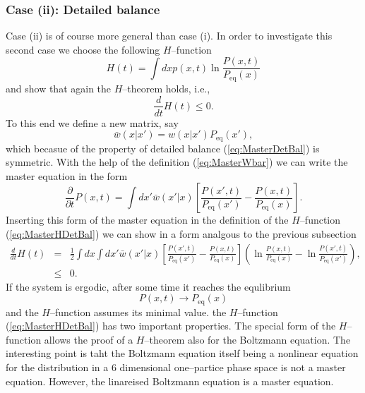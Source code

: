 \subsubsection{Case (ii): Detailed balance}
Case (ii) is of course more general than case (i). In order to
investigate this second case we choose the following $H$--function
\begin{equation}
\label{eq:MasterHDetBal}
  H(t) = \int dx p(x,t) \ln \frac{P(x,t)}{P_{\textrm{eq}}(x)}
\end{equation}
and show that again the $H$--theorem holds, i.e.,
\begin{displaymath}
  \frac{d}{dt} H(t) \le 0.
\end{displaymath}
To this end we define a new matrix, say
\begin{equation}
\label{eq:MasterWbar}
  \bar{w}(x|x') = w(x|x') P_{\textrm{eq}}(x'),
\end{equation}
which becasue of the property of detailed balance (\ref{eq:MasterDetBal}) 
is symmetric.  With the help of the definition (\ref{eq:MasterWbar}) we can
write the master equation in the form 
\begin{displaymath}
  \frac{\partial}{\partial t} P(x,t) = \int dx'  \bar{w}(x'|x)
   \left[ \frac{P(x',t)}{P_{\textrm{eq}}(x')} -
          \frac{P(x,t)}{P_{\textrm{eq}}(x)}         \right].
\end{displaymath}
Inserting this form of the master equation in the definition of the
$H$--function (\ref{eq:MasterHDetBal}) we can show in a form analgous to the
previous subsection
\begin{eqnarray*}
  \frac{d}{dt} H(t) & = & \frac{1}{2} \int dx \int dx' 
                   \bar{w}(x'|x) \left[ \frac{P(x',t)}{P_{\textrm{eq}}(x')} -
          \frac{P(x,t)}{P_{\textrm{eq}}(x)}         \right]
            \left( \ln \frac{P(x,t)}{P_{\textrm{eq}}(x)} 
               - \ln \frac{P(x',t)}{P_{\textrm{eq}}(x')}  \right), \\
    & \le & 0.
\end{eqnarray*}
If the system is ergodic, after some time it reaches the equlibrium
\begin{displaymath}
  P(x,t) \longrightarrow P_{\textrm{eq}}(x) 
\end{displaymath}
and the $H$--function assumes its minimal value. the $H$--function 
(\ref{eq:MasterHDetBal}) has two important properties. 
The special form of
the $H$--function allows the proof of a $H$--theorem also for the Boltzmann
equation. The interesting point is taht the Boltzmann equation itself being a
nonlinear equation for the distribution in a 6 dimensional one--partice
phase space is not a master equation. However, the linareised Boltzmann
equation is a master equation.

